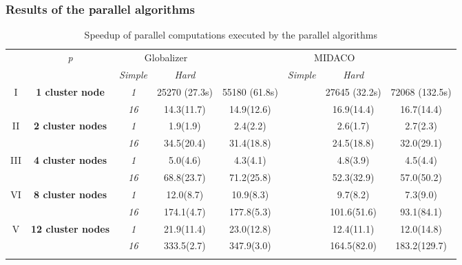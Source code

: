 \documentclass[aspectratio=1610]{beamer}
\begin{document}
\begin{frame}
  \frametitle{Results of the parallel algorithms}
  \begin{table}
    \centering
    \caption{Speedup of parallel computations executed by the parallel algorithms}
    \label{tab:speedup}
    \begin{tabular}{cccccccc}
      \cline{3-8}\noalign{\smallskip}
      \multicolumn{2}{c}{  } & \textit{p} & \multicolumn{2}{c}{Globalizer} & &
  \multicolumn{2}{c}{MIDACO}   \\
      \noalign{\smallskip} \cline{4-5} \cline{7-8}  \noalign{\smallskip}
      \multicolumn{2}{c}{  } & & \textit{Simple} & \textit{Hard} & & \textit{Simple} &
  \textit{Hard}  \\
      \noalign{\smallskip}\hline
  I  & \textbf{1 cluster node}  %
      & \textit{1}   & 25270 (27.3s) & 55180 (61.8s) & & 27645 (32.2s) & 72068 (132.5s)  \\
    &  & \textit{16} & 14.3(11.7) & 14.9(12.6)  & &  16.9(14.4) & 16.7(14.4) \\
    \hline \noalign{\smallskip}
  II  & \textbf{2 cluster nodes}  %
    & \textit{1}      &   1.9(1.9) & 2.4(2.2)  & & 2.6(1.7) & 2.7(2.3) \\
    &   & \textit{16} & 34.5(20.4) & 31.4(18.8) & & 24.5(18.8) & 32.0(29.1) \\
      \noalign{\smallskip}\hline	\noalign{\smallskip}
  III  & \textbf{4 cluster nodes}  %
  & \textit{1}      & 5.0(4.6) & 4.3(4.1) & & 4.8(3.9) & 4.5(4.4) \\
  &   & \textit{16} & 68.8(23.7) & 71.2(25.8) & & 52.3(32.9) & 57.0(50.2) \\
    \noalign{\smallskip}\hline	\noalign{\smallskip}
  VI & \textbf{8 cluster nodes} %
  & \textit{1}    & 12.0(8.7) & 10.9(8.3) & & 9.7(8.2)    & 7.3(9.0)    \\
  & & \textit{16} & 174.1(4.7) & 177.8(5.3) & & 101.6(51.6) & 93.1(84.1) \\
      \noalign{\smallskip}\hline
      V & \textbf{12 cluster nodes} %
      & \textit{1}    & 21.9(11.4)  & 23.0(12.8)  & & 12.4(11.1)  & 12.0(14.8)  \\
      & & \textit{16} & 333.5(2.7) & 347.9(3.0) & & 164.5(82.0) & 183.2(129.7) \\
          \noalign{\smallskip}\hline
    \end{tabular}
  \end{table}
\end{frame}
\end{document}
